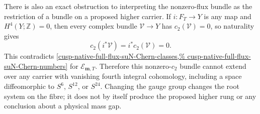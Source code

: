 There is also an exact obstruction to interpreting the nonzero-flux bundle
as the restriction of a bundle on a proposed higher carrier.  If
\(i:F_T\to Y\) is any map and \(H^4(Y;\mathbb Z)=0\), then every complex
bundle \(\mathscr V\to Y\) has \(c_2(\mathscr V)=0\), so naturality gives
\[
 c_2(i^*\mathscr V)=i^*c_2(\mathscr V)=0.
\]
This contradicts
\cref{cusp-native-full-flux-suN-Chern-classes,%
cusp-native-full-flux-suN-Chern-numbers} for
\(\mathscr E_{\mathbf m,T}\).  Therefore this nonzero-\(c_2\) bundle cannot
extend over any carrier with vanishing fourth integral cohomology, including
a space diffeomorphic to \(S^6\), \(S^{12}\), or \(S^{24}\).  Changing the
gauge group changes the root system on the fibre; it does not by itself
produce the proposed higher rung or any conclusion about a physical mass
gap.
